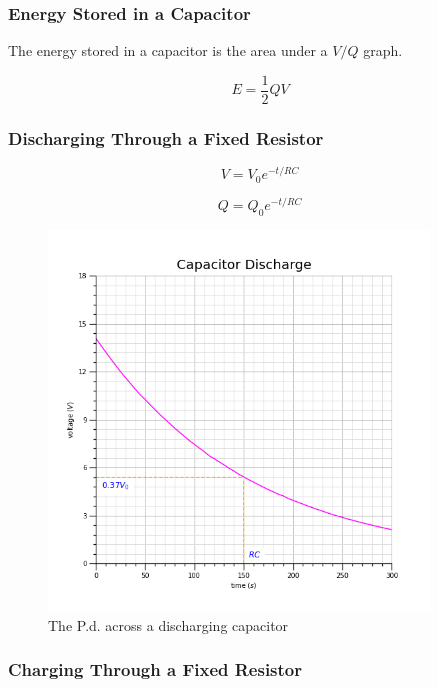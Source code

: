 \documentclass[12pt]{article}
\begin{document}
\subsubsection{Energy Stored in a Capacitor}
\label{sec:org5987afb}

The energy stored in a capacitor is the area under a \(V/Q\) graph.

\[E = \dfrac{1}{2} QV\]

\subsubsection{Discharging Through a Fixed Resistor}
\label{sec:org41a52d3}

\[V = V_0 e^{-t/RC}\]

\[Q = Q_0 e^{-t/RC}\]

\begin{figure}[H]
\centering
\includegraphics[width=0.9\textwidth,keepaspectratio]{./images/capacitor_exp_discharge.png}
\caption{The P.d. across a discharging capacitor}
\end{figure}

\subsubsection{Charging Through a Fixed Resistor}
\label{sec:org4ddcc77}
\end{document}
